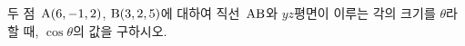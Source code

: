 두 점~$\mathrm{A}(6{,}\mkern3mu\mathopen{}-1{,}\mkern3mu\mathopen{}2)$, $\mathrm{B}(3{,}\mkern3mu\mathopen{}2{,}\mkern3mu\mathopen{}5)$에 대하여 직선~$\mathrm{AB}$와 $yz$평면이 이루는 각의 크기를 $\theta$라 할 때, $\cos\theta$의 값을 구하시오.

